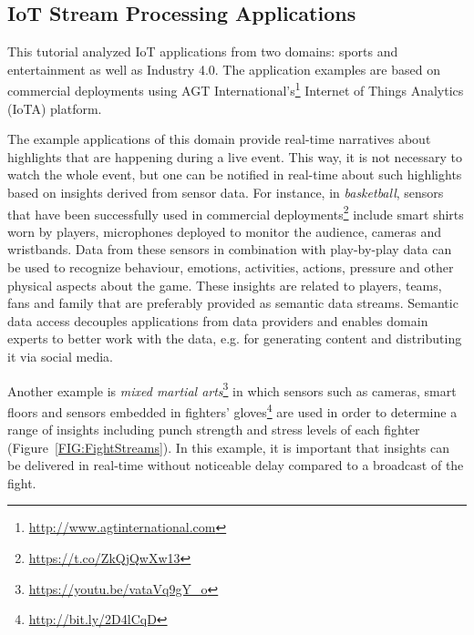 \subsection{IoT Stream Processing Applications}
This tutorial analyzed IoT applications from two domains: sports and entertainment as well as Industry 4.0. The application examples are based on commercial deployments using AGT International's\footnote{\url{http://www.agtinternational.com}} Internet of Things Analytics (IoTA) platform.

The example applications of this domain provide real-time narratives about highlights that are happening during a live event. This way, it is not necessary to watch the whole event, but one can be notified in real-time about such highlights based on insights derived from sensor data. For instance, in \emph{basketball}, sensors that have been successfully used in commercial deployments\footnote{\url{https://t.co/ZkQjQwXw13}} include smart shirts worn by players, microphones deployed to monitor the audience,  cameras and wristbands. Data from these sensors in combination with play-by-play data can be used to recognize behaviour, emotions, activities, actions, pressure and other physical aspects about the game. These insights are related to players, teams, fans and family that are preferably provided as semantic data streams. Semantic data access decouples applications from data providers and enables domain experts to better work with the data, e.g. for generating content and distributing it via social media.

Another example is \emph{mixed martial arts}\footnote{\url{https://youtu.be/vataVq9gY_o}} in which sensors such as cameras, smart floors and sensors embedded in fighters' gloves\footnote{\url{http://bit.ly/2D4lCqD}} are used in order to determine a range of insights including punch strength and stress levels of each fighter (Figure~\ref{FIG:FightStreams}). In this example, it is important that insights can be delivered in real-time without noticeable delay compared to a broadcast of the fight.

